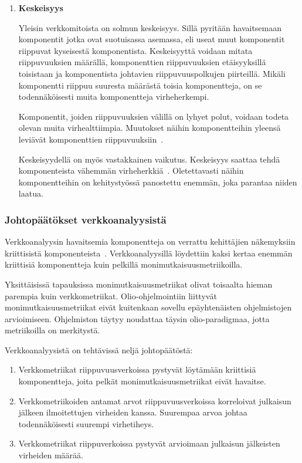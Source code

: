 \documentclass[finnish]{../tktltiki2}
\theoremstyle{definition}
\theoremstyle{remark}
\begin{document}
\begin{enumerate}
    \item {\bf Keskeisyys}
    
    Yleisin verkkomitoista on solmun keskeisyys. Sillä pyritään havaitsemaan komponentit jotka ovat suotuisassa 
    asemassa, eli useat muut komponentit riippuvat kyseisestä komponentista. Keskeisyyttä voidaan mitata riippuvuuksien 
    määrällä, komponenttien riippuvuuksien etäisyyksillä toisistaan ja komponentista johtavien riippuvuuspolkujen 
    piirteillä. Mikäli komponentti riippuu suuresta määrästä toisia komponentteja, on se todennäköisesti muita 
    komponentteja virheherkempi.
    
    Komponentit, joiden riippuvuuksien välillä on lyhyet polut, voidaan todeta olevan muita virhealttiimpia. Muutokset 
    näihin komponentteihin yleensä leviävät komponenttien riippuvuuksiin~\cite{ZN08}.
    
    Keskeisyydellä on myös vastakkainen vaikutus. Keskeisyys saattaa tehdä komponenteista vähemmän 
    virheherkkiä~\cite{ZN08}. Oletettavasti näihin komponentteihin on kehitystyössä panostettu enemmän, joka parantaa 
    niiden laatua.
    
\end{enumerate}

\subsubsection{Johtopäätökset verkkoanalyysistä}

Verkkoanalyysin havaitsemia komponentteja on verrattu kehittäjien näkemyksiin kriittisistä komponenteista~\cite{ZN08}. 
Verkkoanalyysillä löydettiin kaksi kertaa enemmän kriittisiä komponentteja kuin pelkillä monimutkaisuusmetriikoilla.

    Yksittäisissä tapauksissa monimutkaisuusmetriikat olivat toisaalta hieman parempia kuin verkkometriikat. 
Olio-ohjelmointiin liittyvät monimutkaisuusmetriikat eivät kuitenkaan sovellu epäyhtenäisten ohjelmistojen arvioimiseen. 
Ohjelmiston täytyy noudattaa täysin olio-paradigmaa, jotta metriikoilla on merkitystä.\newline

\noindent Verkkoanalyysistä on tehtävissä neljä johtopäätöstä:

\begin{enumerate}

    \item Verkkometriikat riippuvuusverkoissa pystyvät löytämään kriittisiä komponentteja, joita pelkät 
          monimutkaisuusmetriikat eivät havaitse.
          
    \item Verkkometriikoiden antamat arvot riippuvuusverkoissa korreloivat julkaisun jälkeen ilmoitettujen virheiden 
          kanssa. Suurempaa arvoa johtaa todennäköisesti suurempi virhetiheys.
          
    \item Verkkometriikat riippuverkoissa pystyvät arvioimaan julkaisun jälkeisten virheiden määrää.

\end{enumerate}
\end{document}
